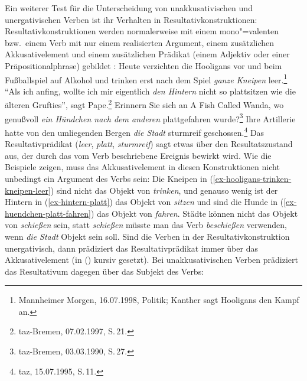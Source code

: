 Ein weiterer Test für die Unterscheidung von unakkusativischen und unergativischen
Verben ist ihr Verhalten in Resultativkonstruktionen:
Resultativkonstruktionen werden normalerweise mit einem mono"=valenten bzw.\
einem Verb mit nur einem realisierten Argument, einem zusätzlichen Akkusativelement
und einem zusätzlichen Prädikat (einem Adjektiv oder einer Präpositionalphrase)
gebildet \parencites{Wunderlich97c}[Kapitel~5]{Mueller2002b}:
\eal
\label{ex-unakkusativ-Resultativkonstruktion}
\ex  Heute verzichten die Hooligans vor und beim Fußballspiel auf Alkohol und trinken 
      erst nach dem Spiel \emph{ganze Kneipen} leer\iw{leer}.\label{ex-hooligans-trinken-kneipen-leer}\footnote{
        Mannheimer Morgen, 16.07.1998, Politik; Kanther sagt Hooligans den Kampf an.
}
\ex\label{ex-hintern-platt} "`Als ich anfing, wollte ich mir eigentlich \emph{den Hintern} nicht so plattsitzen 
wie die älteren Grufties"', sagt Pape.\footnote{
        taz-Bremen, 07.02.1997, S.\,21.%
}
\ex Erinnern Sie sich an A Fish Called Wanda, wo genußvoll \emph{ein Hündchen nach dem anderen} plattgefahren wurde?\label{ex-huendchen-platt-fahren}\footnote{
        taz-Bremen, 03.03.1990, S.\,27.%
        }
\ex{}
Ihre Artillerie hatte von  den umliegenden Bergen    \emph{die Stadt} sturmreif  geschossen.\label{ex-hatte-die-stadt-sturmreif-geschossen}\footnote{
taz, 15.07.1995, S.\,11.%
}
\zl
Das Resultativprädikat (\emph{leer}, \emph{platt}, \emph{sturmreif}) sagt etwas über den Resultatszustand aus,
der durch das vom Verb beschriebene Ereignis bewirkt wird.
Wie die Beispiele zeigen, muss das Akkusativelement in diesen Konstruktionen nicht unbedingt
ein Argument des Verbs sein: Die Kneipen in (\ref{ex-hooligans-trinken-kneipen-leer}) 
sind nicht das Objekt von \emph{trinken}, und genauso wenig ist der Hintern in (\ref{ex-hintern-platt}) das Objekt von
\emph{sitzen} und sind die Hunde in (\ref{ex-huendchen-platt-fahren}) das Objekt von \emph{fahren}. Städte können nicht das Objekt
von \emph{schießen} sein, statt \emph{schießen} müsste man das Verb \emph{beschießen} verwenden, wenn \emph{die Stadt}
Objekt sein soll. Sind die Verben in der Resultativkonstruktion unergativisch, dann prädiziert
das Resultativprädikat immer über das Akkusativelement (in (\mex{0}) kursiv gesetzt). Bei unakkusativischen Verben
prädiziert das Resultativum dagegen über das Subjekt des Verbs:
